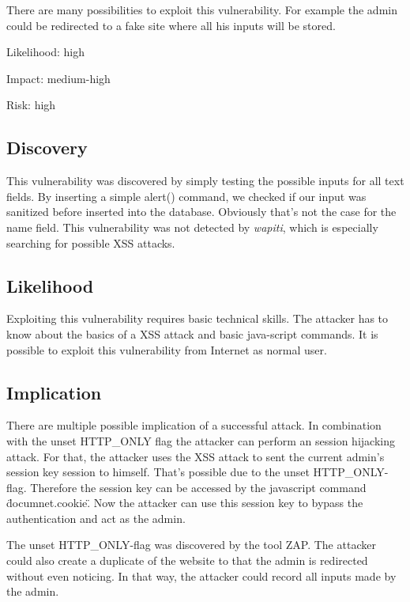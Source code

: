 There are many possibilities to exploit this vulnerability. For example the admin could be redirected to a fake site where all his inputs will be stored.\newline


Likelihood: high \newline

Impact: medium-high\newline

Risk: high\newline

\subsection{Discovery}

This vulnerability was discovered by simply testing the possible inputs for all text fields. By inserting a simple alert() command, we checked if our input was sanitized before inserted into the database. Obviously that's not the case for the name field. This vulnerability was not detected by \textit{wapiti}, which is especially searching for possible XSS attacks.

\subsection{Likelihood}
Exploiting this vulnerability requires basic technical skills. The attacker has to know about the basics of a XSS attack and basic java-script commands. It is possible to exploit this vulnerability from Internet as normal user.

\subsection{Implication}
There are multiple possible implication of a successful attack.  In combination with the unset HTTP\_ONLY flag  the attacker can perform an session hijacking  attack. For that, the attacker uses the XSS attack to sent the current admin's session key session to himself. That's possible due to the unset HTTP\_ONLY-flag.  Therefore the session key can be accessed by the javascript command \"documnet.cookie\". Now the attacker can use this session key to bypass the authentication and act as the admin. 

The unset HTTP\_ONLY-flag  was discovered by the tool ZAP.
The attacker could also create a duplicate of the website to that the admin is redirected without even noticing. In that way, the attacker could record all inputs made by the admin.



